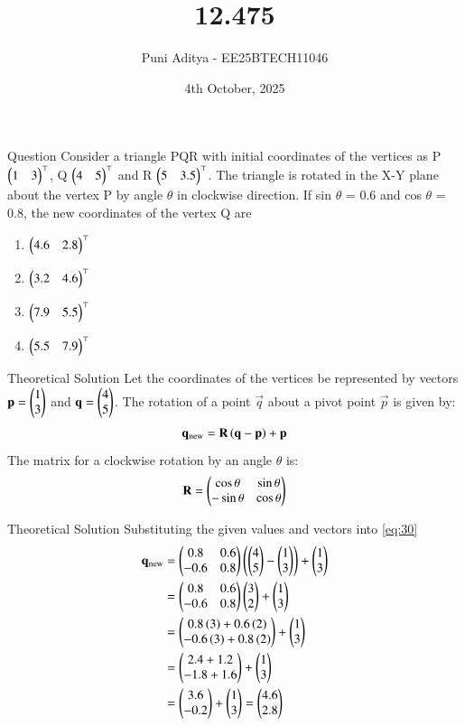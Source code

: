 \documentclass{beamer}
\title{12.475}
\date{4th October, 2025}
\author{Puni Aditya - EE25BTECH11046}
\begin{document}
\frame{\titlepage}
\begin{frame}{Question}
Consider a triangle PQR with initial coordinates of the vertices as P $\begin{pmatrix}1 & 3\end{pmatrix}^\top$, Q $\begin{pmatrix}4 & 5\end{pmatrix}^\top$ and R $\begin{pmatrix}5 & 3.5\end{pmatrix}^\top$. The triangle is rotated in the X-Y plane about the vertex P by angle $\theta$ in clockwise direction. If sin $\theta$ = 0.6 and cos $\theta$ = 0.8, the new coordinates of the vertex Q are
\begin{enumerate}
    \item $\begin{pmatrix}4.6 & 2.8\end{pmatrix}^\top$
    \item $\begin{pmatrix}3.2 & 4.6\end{pmatrix}^\top$
    \item $\begin{pmatrix}7.9 & 5.5\end{pmatrix}^\top$
    \item $\begin{pmatrix}5.5 & 7.9\end{pmatrix}^\top$
\end{enumerate}
\end{frame}

\begin{frame}{Theoretical Solution}
Let the coordinates of the vertices be represented by vectors $\mathbf{p} = \begin{pmatrix}1 \\ 3\end{pmatrix}$ and $\mathbf{q} = \begin{pmatrix}4 \\ 5\end{pmatrix}$.
The rotation of a point $\vec{q}$ about a pivot point $\vec{p}$ is given by:
\begin{align}
    \mathbf{q}_{\text{new}} = \mathbf{R}\left(\mathbf{q} - \mathbf{p}\right) + \mathbf{p} \label{eq:30}
\end{align}
The matrix for a clockwise rotation by an angle $\theta$ is:
\begin{align}
    \mathbf{R} = \begin{pmatrix}\cos\theta & \sin\theta \\ -\sin\theta & \cos\theta\end{pmatrix}
\end{align}
\end{frame}

\begin{frame}{Theoretical Solution}
Substituting the given values and vectors into \eqref{eq:30}
\begin{align}
    \mathbf{q}_{\text{new}} &= \begin{pmatrix}0.8 & 0.6 \\ -0.6 & 0.8\end{pmatrix}\left(\begin{pmatrix}4 \\ 5\end{pmatrix} - \begin{pmatrix}1 \\ 3\end{pmatrix}\right) + \begin{pmatrix}1 \\ 3\end{pmatrix}  \\
    &= \begin{pmatrix}0.8 & 0.6 \\ -0.6 & 0.8\end{pmatrix}\begin{pmatrix}3 \\ 2\end{pmatrix} + \begin{pmatrix}1 \\ 3\end{pmatrix}  \\
    &= \begin{pmatrix}0.8\left(3\right) + 0.6\left(2\right) \\ -0.6\left(3\right) + 0.8\left(2\right)\end{pmatrix} + \begin{pmatrix}1 \\ 3\end{pmatrix}  \\
    &= \begin{pmatrix}2.4 + 1.2 \\ -1.8 + 1.6\end{pmatrix} + \begin{pmatrix}1 \\ 3\end{pmatrix}  \\
    &= \begin{pmatrix}3.6 \\ -0.2\end{pmatrix} + \begin{pmatrix}1 \\ 3\end{pmatrix} = \begin{pmatrix}4.6 \\ 2.8\end{pmatrix}
\end{align}
\end{frame}
\end{document}
